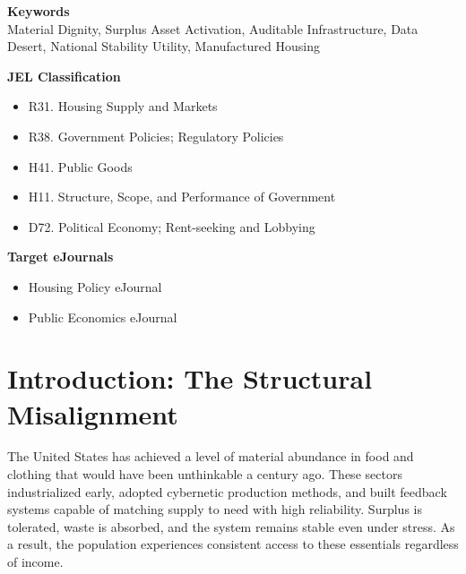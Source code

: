 \documentclass[12pt, letterpaper]{article}
\begin{document}
{\footnotesize{}

\noindent\textbf{Keywords}\\[1pt]
Material Dignity, Surplus Asset Activation, Auditable Infrastructure, Data Desert, National Stability Utility, Manufactured Housing

\vspace{8pt}
\noindent\textbf{JEL Classification}
\begin{itemize}[nosep, before={\vspace{-8pt}}, leftmargin=2em]
    \item R31. Housing Supply and Markets
    \item R38. Government Policies; Regulatory Policies
    \item H41. Public Goods
    \item H11. Structure, Scope, and Performance of Government
    \item D72. Political Economy; Rent-seeking and Lobbying
\end{itemize}

\vspace{8pt}
\noindent\textbf{Target eJournals}
\begin{itemize}[nosep, before={\vspace{-8pt}}, leftmargin=2em]
    \item Housing Policy eJournal
    \item Public Economics eJournal
\end{itemize}



}

\newpage
\begingroup
{}
\setlength{\cftbeforesecskip}{2pt}
\setlength{\cftbeforesubsecskip}{-2pt}
\tableofcontents
\endgroup

\newpage
{}

\section{Introduction: The Structural Misalignment}

The United States has achieved a level of material abundance in food and clothing that would have been unthinkable a century ago. These sectors industrialized early, adopted cybernetic production methods, and built feedback systems capable of matching supply to need with high reliability. Surplus is tolerated, waste is absorbed, and the system remains stable even under stress. As a result, the population experiences consistent access to these essentials regardless of income.
\end{document}
